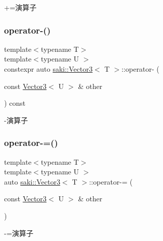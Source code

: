 +=演算子 

\mbox{\label{classsaki_1_1_vector3_a9ff13b4e1114404b1b5391cd6aecb7c7}} 
\subsubsection{\texorpdfstring{operator-\/()}{operator-()}}
{\footnotesize\ttfamily template$<$typename T$>$ \\
template$<$typename U $>$ \\
constexpr auto \mbox{\hyperlink{classsaki_1_1_vector3}{saki\+::\+Vector3}}$<$ T $>$\+::operator-\/ (\begin{DoxyParamCaption}\item[{const \mbox{\hyperlink{classsaki_1_1_vector3}{Vector3}}$<$ U $>$ \&}]{other }\end{DoxyParamCaption}) const\hspace{0.3cm}{\ttfamily [inline]}}



-\/演算子 

\mbox{\label{classsaki_1_1_vector3_a3c15f413dc1c0aaef7311bd6dbb7224d}} 
\subsubsection{\texorpdfstring{operator-\/=()}{operator-=()}}
{\footnotesize\ttfamily template$<$typename T$>$ \\
template$<$typename U $>$ \\
auto \mbox{\hyperlink{classsaki_1_1_vector3}{saki\+::\+Vector3}}$<$ T $>$\+::operator-\/= (\begin{DoxyParamCaption}\item[{const \mbox{\hyperlink{classsaki_1_1_vector3}{Vector3}}$<$ U $>$ \&}]{other }\end{DoxyParamCaption})\hspace{0.3cm}{\ttfamily [inline]}}



-\/=演算子 

\mbox{\label{classsaki_1_1_vector3_a217f6ed4a5ea25f40983574077f8e71d}} 
